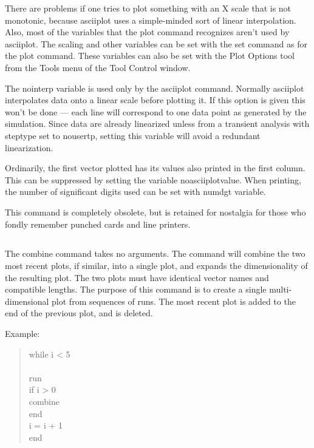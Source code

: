 There are problems if one tries to plot something with an X scale that
is not monotonic, because {\cb asciiplot} uses a simple-minded sort of
linear interpolation.  Also, most of the variables that the {\cb plot}
command recognizes aren't used by {\cb asciiplot}.  The scaling and
other variables can be set with the {\cb set} command as for the {\cb
plot} command.  These variables can also be set with the {\cb Plot
Options} tool from the {\cb Tools} menu of the {\cb Tool Control}
window.

The {\et nointerp} variable is used only by the {\cb asciiplot}
command.  Normally {\cb asciiplot} interpolates data onto a linear
scale before plotting it.  If this option is given this won't be done
--- each line will correspond to one data point as generated by the
simulation.  Since data are already linearized unless from a transient
analysis with {\et steptype} set to {\vt nousertp}, setting this
variable will avoid a redundant linearization.

Ordinarily, the first vector plotted has its values also printed in
the first column.  This can be suppressed by setting the variable {\et
noasciiplotvalue}.  When printing, the number of significant digits
used can be set with {\et numdgt} variable.

This command is completely obsolete, but is retained for nostalgia for
those who fondly remember punched cards and line printers.

\subsection{}


The {\cb combine} command takes no arguments.  The command will
combine the two most recent plots, if similar, into a single plot, and
expands the dimensionality of the resulting plot.  The two plots must
have identical vector names and compatible lengths.  The purpose of
this command is to create a single multi-dimensional plot from
sequences of runs.  The most recent plot is added to the end of the
previous plot, and is deleted.

Example:
\begin{quote}
{\vt\raggedright
while i < 5\\
\\
\qquad run\\
\qquad if i > 0\\
\qquad\qquad combine\\
\qquad end\\
\qquad i = i + 1\\
end}
\end{quote}

